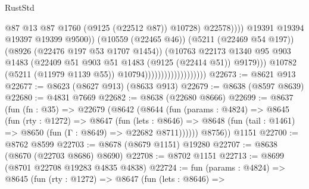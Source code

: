 \begin{lexlean}{RustStd}
\begin{coremodule}
                                                          @87
                                                          @13
                                                          @87
                                                          @1760
                                                          (@9125 (@22512 @87))
                                                          @10728)
                                                        @22578))))
                                                @19391
                                                @19394
                                                @19397
                                                @19399
                                                @9500))
                                            (@10559 (@22465 @46))
                                            (@5211 (@22469 @54 @197))
                                            (@8926 (@22476 @197 @53 @1707 @1454))
                                            (@10763
                                              @22173
                                              @1340
                                              @95
                                              @903
                                              @1483
                                              (@22409
                                                @51
                                                @903
                                                @51
                                                @1483
                                                (@9125 (@22414 @51))
                                                @9179)))
                                          @10782
                                          (@5211 (@11979 @1139 @55))
                                          @10794)))))))))))))))))))
@22673 := @8621 @913
@22677 := @8623 (@8627 @913) (@8633 @913)
@22679 := @8638 (@8597 @8639)
@22680 := @4831 @7669
@22682 := @8638 (@22680 @8666)
@22699 := @8637
    (fun (fn : @35) =>
    @22679
      (@8642
        (@8644
          (fun (params : @4824) =>
          @8645
            (fun (rty : @1272) =>
            @8647
              (fun (lets : @8646) =>
              @8648 (fun (tail : @1461) => @8650 (fun (Γ : @8649) => @22682 @8711))))))
        @8756))
    @1151
@22700 := @8762 @8599
@22703 := @8678 (@8679 @1151) @19280
@22707 := @8638 (@8670 (@22703 @8686) @8690)
@22708 := @8702 @1151
@22713 := @8699 (@8701 @22708 @19283 @4835 @4838)
@22724 := fun (params : @4824) =>
  @8645
    (fun (rty : @1272) =>
    @8647
      (fun (lets : @8646) =>

\end{coremodule}
\end{lexlean}
